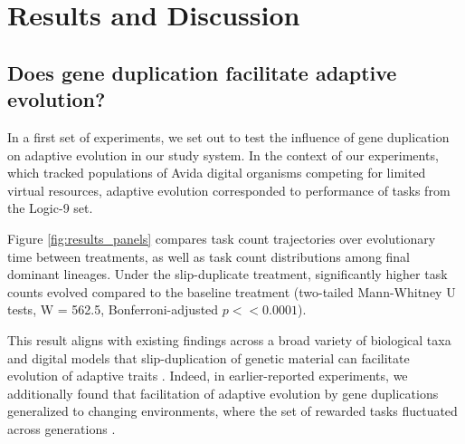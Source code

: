 \section{Results and Discussion} \label{sec:results}

\subsection{Does gene duplication facilitate adaptive evolution?}

In a first set of experiments, we set out to test the influence of gene duplication on adaptive evolution in our study system.
In the context of our experiments, which tracked populations of Avida digital organisms competing for limited virtual resources, adaptive evolution corresponded to performance of tasks from the Logic-9 set.

Figure \ref{fig:results_panels} compares task count trajectories over evolutionary time between treatments, as well as task count distributions among final dominant lineages.
Under the slip-duplicate treatment, significantly higher task counts  evolved compared to the baseline treatment (two-tailed Mann-Whitney U tests, W = 562.5, Bonferroni-adjusted $p << 0.0001$).

This result aligns with existing findings across a broad variety of biological taxa and digital models that slip-duplication of genetic material can facilitate evolution of adaptive traits \citep{Koza:1995fr,Zhang:2003fw,Teichmann:2004cz}.
Indeed, in earlier-reported experiments, we additionally found that facilitation of adaptive evolution by gene duplications generalized to changing environments, where the set of rewarded tasks fluctuated across generations \citep{lalejini2017gene}.




